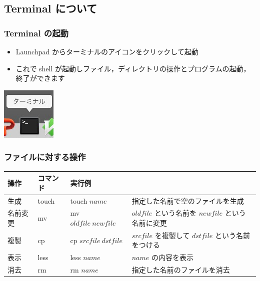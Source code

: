 \subsection{Terminal について}
\begin{frame}[containsverbatim]
\frametitle{Terminal の起動}
  \begin{itemize}
\item Launchpad からターミナルのアイコンをクリックして起動
\item これで shell が起動しファイル，ディレクトリの操作とプログラムの起動，終了ができます
  \end{itemize}
  \begin{center}
\includegraphics[scale=0.5]{./Figure/elementaryCS-figTermIcon.jpg}
  \end{center}
\end{frame}
\begin{frame}
\frametitle{ファイルに対する操作}
\scriptsize
  \begin{tabular}{l|l|lp{4cm}}
操作 & コマンド & 実行例 & \\\hline
生成 & touch & touch $name$ & 指定した名前で空のファイルを生成\\
名前変更 & mv & mv $oldfile\ newfile$ & $oldfile$ という名前を $newfile$ という名前に変更\\
複製 & cp & cp $srcfile\ dstfile$ & $srcfile$ を複製して $dstfile$ という名前をつける\\
表示 & less & less $name$ & $name$ の内容を表示\\
消去 & rm & rm $name$ & 指定した名前のファイルを消去
  \end{tabular}
\end{frame}
